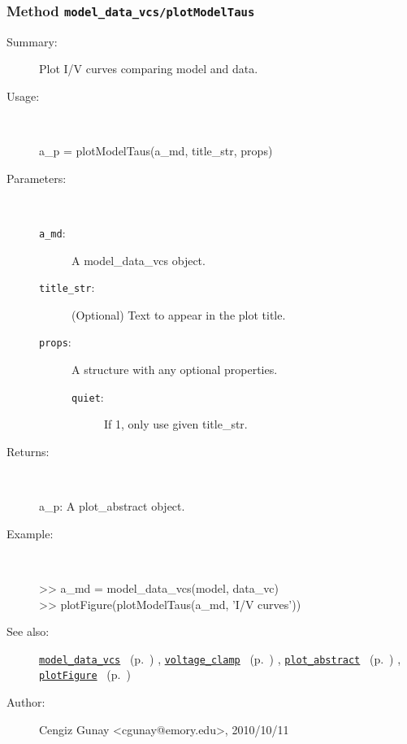 \subsubsection[Method \texttt{plotModelTaus}]{Method \texttt{model\_data\_vcs/plotModelTaus}}%
%
\label{ref_model_data_vcs__plotModelTaus}%
\hypertarget{ref_model_data_vcs__plotModelTaus}{}%
\begin{description}
\item[Summary:]Plot I/V curves comparing model and data.
%
\item[Usage:]~%
\begin{lyxcode}%
a\_p = plotModelTaus(a\_md, title\_str, props)
%
\end{lyxcode}%
%
%
\item[Parameters:]~
\begin{description}%
\item[\texttt{a\_md}:]
 A model\_data\_vcs object.
\item[\texttt{title\_str}:]
 (Optional) Text to appear in the plot title.
\item[\texttt{props}:]
 A structure with any optional properties.
\begin{description}%
\item[\texttt{quiet}:]
 If 1, only use given title\_str.
\end{description}%
\end{description}%
%
\item[Returns:
]~

   a\_p: A plot\_abstract object.
%
\item[Example:]~
\begin{lyxcode} >> a\_md = model\_data\_vcs(model, data\_vc)
\\%
 >> plotFigure(plotModelTaus(a\_md, 'I/V curves'))
\\%
\end{lyxcode}
%
\item[See also:]%
\hyperlink{ref_model_data_vcs}{\texttt{model\_data\_vcs}}%
\ (p.~\pageref{ref_model_data_vcs})%
%
, \hyperlink{ref_voltage_clamp}{\texttt{voltage\_clamp}}%
\ (p.~\pageref{ref_voltage_clamp})%
%
, \hyperlink{ref_plot_abstract}{\texttt{plot\_abstract}}%
\ (p.~\pageref{ref_plot_abstract})%
%
, \hyperlink{ref_plotFigure}{\texttt{plotFigure}}%
\ (p.~\pageref{ref_plotFigure})%
%
%
\item[Author:]%
Cengiz Gunay <cgunay@emory.edu>, 2010/10/11
%
\end{description}
\methodline%
